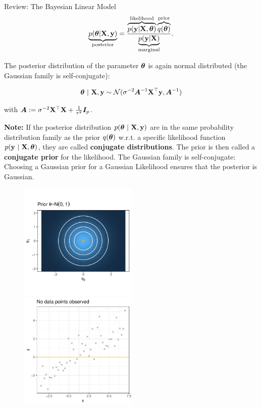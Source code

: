 \documentclass[11pt,compress,t,notes=noshow, xcolor=table]{beamer}
\begin{document}
\begin{vbframe}{Review: The Bayesian Linear Model}
$$
\underbrace{p(\bm{\theta} | \mathbf{X}, \mathbf{y})}_{\text{posterior}} = \frac{\overbrace{p(\mathbf{y} | \mathbf{X}, \bm{\theta})}^{\text{likelihood}}\overbrace{q(\bm{\theta})}^{\text{prior}}}{\underbrace{p(\mathbf{y}|\mathbf{X})}_{\text{marginal}}}. 
$$

\framebreak 

The posterior distribution of the parameter $\bm{\theta}$ is again normal distributed (the Gaussian family is self-conjugate): 

$$
\bm{\theta} ~|~ \mathbf{X}, \mathbf{y} \sim \mathcal{N}(\sigma^{-2}\bm{A}^{-1}\mathbf{X}^\top\mathbf{y}, \bm{A}^{-1})
$$

with $\bm{A}:= \sigma^{-2}\mathbf{X}^\top\mathbf{X} + \frac{1}{\tau^2} \boldsymbol{I}_p$.

\lz 

\begin{footnotesize}
\textbf{Note:} If the posterior distribution $p(\bm{\theta}~|~\mathbf{X}, \mathbf{y})$ are in the same probability distribution family as the prior $q(\bm{\theta})$ w.r.t. a specific likelihood function $p(\mathbf{y}~|~\mathbf{X}, \bm{\theta})$, they are called \textbf{conjugate distributions}. The prior is then called a \textbf{conjugate prior} for the likelihood. The Gaussian family is self-conjugate: Choosing a Gaussian prior for a Gaussian Likelihood ensures that the posterior is Gaussian. 
\end{footnotesize}

\framebreak 

\begin{figure}
  \includegraphics[width=0.5\textwidth]{figure/bayes_lm/prior_1.pdf}~\includegraphics[width=0.5\textwidth]{figure/bayes_lm/prior_2.pdf}
\end{figure}


\end{vbframe}
\end{document}
